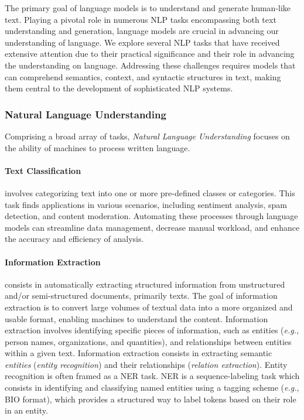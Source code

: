 The primary goal of language models is to understand and generate human-like text. Playing a pivotal role in numerous \ac{NLP} tasks encompassing both text understanding and generation, language models are crucial in advancing our understanding of language. We explore several \ac{NLP} tasks that have received extensive attention due to their practical significance and their role in advancing the understanding on language. Addressing these challenges requires models that can comprehend semantics, context, and syntactic structures in text, making them central to the development of sophisticated \ac{NLP} systems.

\subsubsection{Natural Language Understanding}

Comprising a broad array of tasks, \textit{Natural Language Understanding} focuses on the ability of machines to process written language. 

\paragraph{Text Classification} involves categorizing text into one or more pre-defined classes or categories. This task finds applications in various scenarios, including sentiment analysis, spam detection, and content moderation. Automating these processes through language models can streamline data management, decrease manual workload, and enhance the accuracy and efficiency of analysis. 

\paragraph{Information Extraction} consists in automatically extracting structured information from unstructured and/or semi-structured documents, primarily texts. The goal of information extraction is to convert large volumes of textual data into a more organized and usable format, enabling machines to understand the content. Information extraction involves identifying specific pieces of information, such as entities (\textit{e.g.}, person names, organizations, and quantities), and relationships between entities within a given text. Information extraction consists in extracting semantic \textit{entities} (\textit{entity recognition}) and their relationships (\textit{relation extraction}). Entity recognition is often framed as a \ac{NER} task. \ac{NER} is a sequence-labeling task which consists in identifying and classifying named entities using a tagging scheme (\textit{e.g.}, BIO format), which provides a structured way to label tokens based on their role in an entity. 

